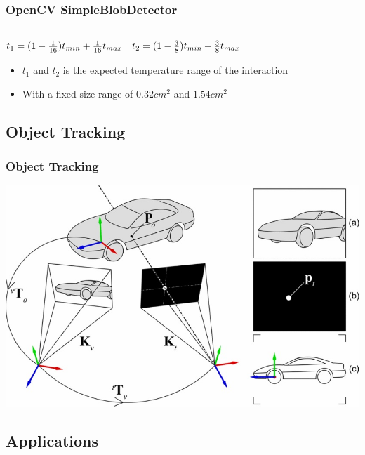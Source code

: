 \documentclass{beamer}
\begin{document}
\begin{frame}
\frametitle{OpenCV SimpleBlobDetector}
	\(
\begin{matrix} \\
 t_{1}=(1-{1\over 16})t_{ min}+{1\over 16}t_{ max} & t_{2}=(1-{3\over 8})t_{ min}+{3\over 8}t_{ max}\cr 
 \end{matrix} 
\)

	\begin{itemize}
		\item \(t_{1}\) and \(t_{2}\) is the expected temperature range of the interaction
		\item With a fixed size range of \(0.32cm^2\) and \(1.54cm^2\)
	\end{itemize}
\end{frame}

\subsection{Object Tracking}
\begin{frame}	
\frametitle{Object Tracking}
	\includegraphics[width=\textwidth]{../Sample_paper/images/Tracking}

\end{frame}



\subsection{Applications}
\end{document}
